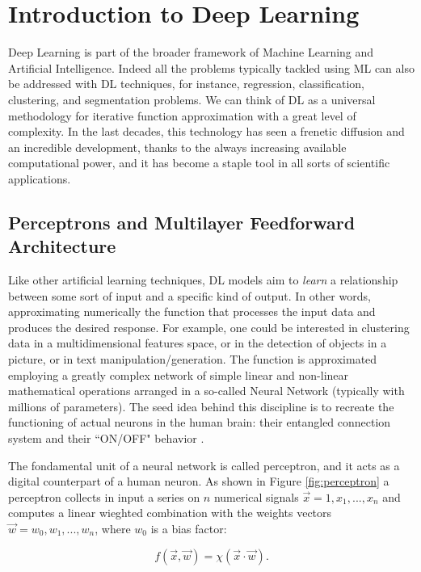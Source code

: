 \section{Introduction to Deep Learning} \label{ssec:DL}
Deep Learning is part of the broader framework of Machine Learning and Artificial Intelligence. Indeed all the problems typically tackled using ML can also be addressed with DL techniques, for instance, regression, classification, clustering, and segmentation problems. We can think of DL as a universal methodology for iterative function approximation with a great level of complexity. In the last decades, this technology has seen a frenetic diffusion and an incredible development, thanks to the always increasing available computational power, and it has become a staple tool in all sorts of scientific applications.

\subsection{Perceptrons and Multilayer Feedforward Architecture}
Like other artificial learning techniques, DL models aim to \textit{learn} a relationship between some sort of input and a specific kind of output. In other words,  approximating numerically the function that processes the input data and produces the desired response. For example, one could be interested in clustering data in a multidimensional features space, or in the detection of objects in a picture, or in text manipulation/generation. The function is approximated employing a greatly complex network of simple linear and non-linear mathematical operations arranged in a so-called Neural Network (typically with millions of parameters). The seed idea behind this discipline is to recreate the functioning of actual neurons in the human brain: their entangled connection system and their ``ON/OFF" behavior \cite{10.5555/3275328}.

The fondamental unit of a neural network is called perceptron, and it acts as a digital counterpart of a human neuron. As shown in Figure \ref{fig:perceptron} a perceptron collects in input a series on $n$ numerical signals $\vec{x} = 1, x_1, ..., x_n $ and computes a linear wieghted combination with the weights vectors $\vec{w} = w_0, w_1, ..., w_n$, where $w_0$ is a bias factor:

\begin{equation}
    f(\vec{x},\vec{w}) = \chi(\vec{x} \cdot \vec{w}).
\end{equation}

